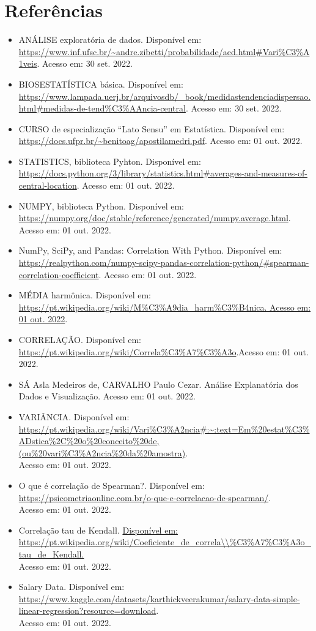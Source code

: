 \documentclass{article}
\begin{document}
\section{Referências}
\begin{itemize}
\item ANÁLISE exploratória de dados. Disponível em:\\ \url{https://www.inf.ufsc.br/~andre.zibetti/probabilidade/aed.html#Vari\%C3\%A1veis}. Acesso em: 30 set. 2022.
\item BIOSESTATÍSTICA básica. Disponível em:\\ \url{https://www.lampada.uerj.br/arquivosdb/\_book/medidastendenciadispersao.html#medidas-de-tend\%C3\%AAncia-central}. Acesso em: 30 set. 2022.
\item CURSO de especialização “Lato Sensu” em Estatística. Disponível em:\\ \url{https://docs.ufpr.br/~benitoag/apostilamedri.pdf}. Acesso em: 01 out. 2022.
\item STATISTICS, biblioteca Pyhton. Disponível em: \url{https://docs.python.org/3/library/statistics.html#averages-and-measures-of-central-location}. Acesso em: 01 out. 2022.
\item NUMPY, biblioteca Python. Disponível em:\\ \url{https://numpy.org/doc/stable/reference/generated/numpy.average.html}. Acesso em: 01 out. 2022.
\item NumPy, SciPy, and Pandas: Correlation With Python. Disponível em: \url{https://realpython.com/numpy-scipy-pandas-correlation-python/#spearman-correlation-coefficient}.  Acesso em: 01 out. 2022.
\item MÉDIA harmônica. Disponível em: \url{https://pt.wikipedia.org/wiki/M\%C3\%A9dia\_harm\%C3\%B4nica. Acesso em: 01 out. 2022}.
\item CORRELAÇÃO. Disponível em: \url{https://pt.wikipedia.org/wiki/Correla\%C3\%A7\%C3\%A3o}.Acesso em: 01 out. 2022.
\item SÁ Asla Medeiros de, CARVALHO Paulo Cezar. Análise Explanatória dos Dados e Visualização. Acesso em: 01 out. 2022.
\item VARIÂNCIA. Disponível em:\\ \url{https://pt.wikipedia.org/wiki/Vari\%C3\%A2ncia#:~:text=Em\%20estat\%C3\%ADstica\%2C\%20o\%20conceito\%20de,(ou\%20vari\%C3\%A2ncia\%20da\%20amostra)}. \\Acesso em: 01 out. 2022.
\item O que é correlação de Spearman?. Disponível em: \url{https://psicometriaonline.com.br/o-que-e-correlacao-de-spearman/}. \\Acesso em: 01 out. 2022.
\item Correlação tau de Kendall. \url{Disponível em: https://pt.wikipedia.org/wiki/Coeficiente\_de\_correla\\\%C3\%A7\%C3\%A3o\_tau\_de\_Kendall. }\\Acesso em: 01 out. 2022.
\item Salary Data. Disponível em: \url{https://www.kaggle.com/datasets/karthickveerakumar/salary-data-simple-linear-regression?resource=download}. \\Acesso em: 01 out. 2022.


\end{itemize}
\end{document}
